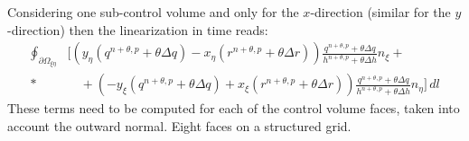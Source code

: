 Considering one sub-control volume and only for the $x$-direction (similar for the
$y$-direction) then the linearization in time reads:
%
\begin{align}
    \oint_{\partial\Omega_{\xi\eta}} & \Bigg[\left( y_\eta\left(q^{n+\theta, p} + \theta \Delta q\right) - x_\eta \left( r^{n+\theta, p} + \theta \Delta r  \right) \right)
    \frac{q^{n+\theta, p} + \theta \Delta q}{h^{n+\theta, p} + \theta \Delta h} n_{\xi} +
    \nonumber\\*
    &\quad  + \left(-y_\xi\left(q^{n+\theta, p} + \theta \Delta q\right) +
    x_\xi\left( r^{n+\theta, p} + \theta \Delta r \right) \right) \frac{q^{n+\theta, p} + \theta \Delta q}{h^{n+\theta, p} + \theta \Delta h} n_\eta
    \Bigg]\, dl
\end{align}
These terms need to be computed for each of the control volume faces, taken
into account the outward normal. Eight faces on a structured grid.

